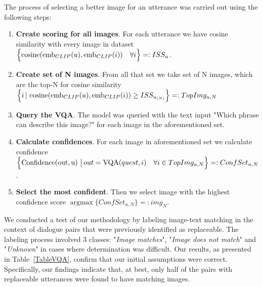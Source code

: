 \smallskip

The process of selecting a better image for an utterance was carried out using the following steps:
\begin{enumerate}
    \item \textbf{Create scoring for all images}. For each utterance we have cosine similarity with every image in dataset $ \Bigl\{ \operatorname{cosine}(\operatorname{emb}_{CLIP}(u), \operatorname{emb}_{CLIP}(i)) \quad \forall i \Bigr\}   =: ISS_u$.
    
    \item \textbf{Create set of N images}. From all that set we take set of N images, which are the top-N for cosine similarity $\Bigl\{i \, | \, \operatorname{cosine}(\operatorname{emb}_{CLIP}(u), \operatorname{emb}_{CLIP}(i)) \geq ISS_{u_{(N)}} \Bigr\} =: TopImg_{u, N}$

    
    \item \textbf{Query the VQA}. The model was queried with the text input "Which phrase can describe this image?" for each image in the aforementioned set.
    


    
    \item \textbf{Calculate confidences}. For each image in aforementioned set we calculate confidence $\Bigl\{ \operatorname{Confidence(out, u)} \, \big| \, out = \operatorname{VQA}(quest, i) \quad \forall i \in TopImg_{u,N}\Bigr\} =: ConfSet_{u,N} $.

    
    \item \textbf{Select the most confident}. Then we select image with the highest confidence score $\operatorname{argmax} \{ConfSet_{u,N}\} =: img_{N}$.
\end{enumerate}

\smallskip

We conducted a test of our methodology by labeling image-text matching in the context of dialogue pairs that were previously identified as replaceable. The labeling process involved 3 classes: "\textit{Image matches}", "\textit{Image does not match}" and "\textit{Unknown}" in cases where determination was difficult. Our results, as presented in Table~\ref{TableVQA}, confirm that our initial assumptions were correct. Specifically, our findings indicate that, at best, only half of the pairs with replaceable utterances were found to have matching images.




